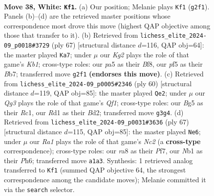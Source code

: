 \documentclass[11pt]{article}
\begin{document}
\clearpage

\begin{figure}[p]\centering
\begin{subfigure}{0.46\textwidth}\centering
\resizebox{\linewidth}{!}{%
\newchessgame
\chessboard[
  setfen={r1b1k3/3p2bp/1q2p3/p4pB1/P1np3P/5NQ1/1P3PK1/RN1R4 w - - 0 38},
  showmover=false,
  pgfstyle=straightmove, color=movearrow, markmove={g2-f1}
]}
\caption{}
\end{subfigure}\hfill
\begin{subfigure}{0.46\textwidth}\centering
\resizebox{\linewidth}{!}{%
\newchessgame
\chessboard[
  setfen={1k3b2/1b6/pnr1p1Q1/qn1pP1P1/1p1P4/1P6/P1P1N2P/1KB2B1R b - - 0 34},
  showmover=false,
  pgfstyle=straightmove, color=movearrow, markmove={b8-a7}
]}
\caption{}
\end{subfigure}
\\[4pt]
\begin{subfigure}{0.46\textwidth}\centering
\resizebox{\linewidth}{!}{%
\newchessgame
\chessboard[
  setfen={1r4k1/2b2pp1/2p3qp/p2n4/P1NP4/2P2PP1/3B3P/2R2QK1 w - - 2 31},
  showmover=false,
  pgfstyle=straightmove, color=movearrow, markmove={f1-e2}
]}
\caption{}
\end{subfigure}\hfill
\begin{subfigure}{0.46\textwidth}\centering
\resizebox{\linewidth}{!}{%
\newchessgame
\chessboard[
  setfen={5bk1/1pnq1pp1/1rn4p/p2pP3/P4N1P/1P1Q1NP1/1B3P1K/R7 b - - 0 34},
  showmover=false,
  pgfstyle=straightmove, color=movearrow, markmove={c7-e6}
]}
\caption{}
\end{subfigure}
\caption{\textbf{Move 38, White: \texttt{Kf1}.} (a) Our position; Melanie plays \texttt{Kf1} (\texttt{g2f1}). Panels (b)--(d) are the retrieved master positions whose correspondence most drove this move (highest QAP objective among those that transfer to it). (b) Retrieved from \texttt{lichess\_elite\_2024-09\_p0018\#3729} (ply 67) [structural distance $d$=116, QAP obj=64]: the master played \texttt{Ka7}; under $\mu$ our \emph{Kg2} plays the role of that game's \emph{Kb1}; cross-type roles: our \emph{p}a5 as their \emph{B}f8, our \emph{p}f5 as their \emph{B}b7; transferred move \texttt{g2f1} \textbf{(endorses this move)}. (c) Retrieved from \texttt{lichess\_elite\_2024-09\_p0005\#2346} (ply 60) [structural distance $d$=119, QAP obj=85]: the master played \texttt{Qe2}; under $\mu$ our \emph{Qg3} plays the role of that game's \emph{Qf1}; cross-type roles: our \emph{B}g5 as their \emph{R}c1, our \emph{R}d1 as their \emph{B}d2; transferred move \texttt{g3g4}. (d) Retrieved from \texttt{lichess\_elite\_2024-09\_p0031\#3636} (ply 67) [structural distance $d$=115, QAP obj=85]: the master played \texttt{Ne6}; under $\mu$ our \emph{Ra1} plays the role of that game's \emph{Nc2} (a \textbf{cross-type} correspondence); cross-type roles: our \emph{r}a8 as their \emph{P}f7, our \emph{N}b1 as their \emph{P}h6; transferred move \texttt{a1a3}. Synthesis: 1 retrieved analog transferred to \texttt{Kf1} (summed QAP objective 64, the strongest correspondence among the candidate moves); Melanie committed it via the \texttt{search} selector.}
\label{fig:thought-m74}
\end{figure}
\end{document}
